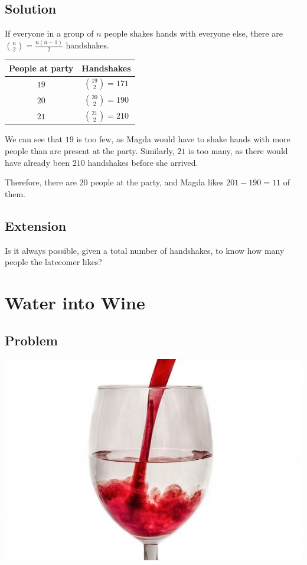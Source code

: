 \documentclass{book}
\begin{document}
\subsection{Solution}
\setlength{\parskip}{6pt}
If everyone in a group of \(n\) people shakes hands with everyone else, there are \( {{n}\choose{2}}= \frac{n(n-1)}{2}\) handshakes.
\renewcommand{\arraystretch}{1.5}
\begin{center}
\begin{tabular}{ |c|c| }

 \hline
 People at party & Handshakes \\
 \hline
 \(19\) & \({{19}\choose{2}}=171\) \\
 \(20\) & \({{20}\choose{2}}=190\) \\
 \(21\) & \({{21}\choose{2}}=210\) \\
 \hline
\end{tabular}
\end{center}

We can see that \(19\) is too few, as Magda would have to shake hands with more people than are present at the party. Similarly, \(21\) is too many, as there would have already been \(210\) handshakes before she arrived.

Therefore, there are \(20\) people at the party, and Magda likes \(201-190=\boxed{11}\) of them.
\subsection{Extension}
Is it always possible, given a total number of handshakes, to know how many people the latecomer likes?
\newpage

\section{Water into Wine}
\subsection{Problem}
\begin{center}
\includegraphics{wine}
\end{center}
\end{document}
